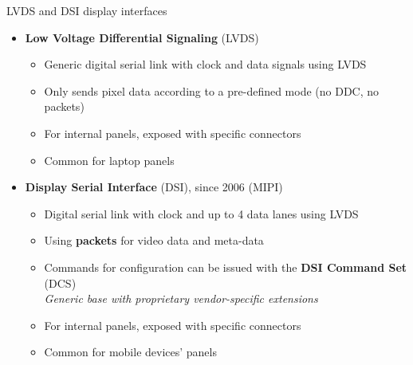 \begin{frame}{LVDS and DSI display interfaces}


  \begin{itemize}
  \item \textbf{Low Voltage Differential Signaling} (LVDS)
    \begin{itemize}
    \item Generic digital serial link with clock and data signals using LVDS
    \item Only sends pixel data according to a pre-defined mode (no DDC, no packets)
    \item For internal panels, exposed with specific connectors
    \item Common for laptop panels
    \end{itemize}
  \end{itemize}
  \begin{itemize}
  \item \textbf{Display Serial Interface} (DSI), since 2006 (MIPI)
    \begin{itemize}
    \item Digital serial link with clock and up to 4 data lanes using LVDS
    \item Using \textbf{packets} for video data and meta-data
    \item Commands for configuration can be issued with the \textbf{DSI Command Set} (DCS)\\
    \textit{Generic base with proprietary vendor-specific extensions}
    \item For internal panels, exposed with specific connectors
    \item Common for mobile devices' panels
    \end{itemize}
  \end{itemize}
\end{frame}

